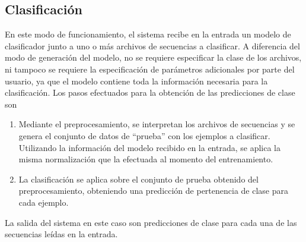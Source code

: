 \subsection{Clasificación}
%
En este modo de funcionamiento, el sistema recibe en la entrada un
modelo de clasificador junto a uno o más archivos de secuencias a
clasificar.  A diferencia del modo de generación del modelo, no se
requiere especificar la clase de los archivos, ni tampoco se requiere
la especificación de parámetros adicionales por parte del usuario, ya
que el modelo contiene toda la información necesaria para la
clasificación. Los pasos efectuados para la obtención de las
predicciones de clase son
%
\begin{enumerate}
\item Mediante el preprocesamiento, se interpretan los archivos de
  secuencias y se genera el conjunto de datos de ``prueba'' con los
  ejemplos a clasificar. Utilizando la información del modelo recibido
  en la entrada, se aplica la misma normalización que la efectuada al
  momento del entrenamiento.
\item La clasificación se aplica sobre el conjunto de prueba obtenido
  del preprocesamiento, obteniendo una predicción de pertenencia de
  clase para cada ejemplo.
\end{enumerate}
%
La salida del sistema en este caso son predicciones de clase para cada
una de las secuencias leídas en la entrada.
